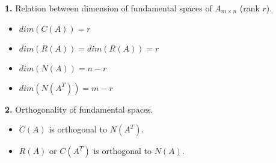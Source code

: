 \documentclass[a4paper]{article}
\numberwithin{equation}{section}
\begin{document}
\begin{itemize}
    \textbf{1.} Relation between dimension of fundamental spaces of $A_{m\times n}$ (rank $r$).
    \begin{itemize}
        \item $dim(C(A))=r$
        \item $dim(R(A))=dim(R(A))=r$
        \item $dim(N(A))=n-r$
        \item $dim(N(A^T))=m-r$
    \end{itemize}
    \textbf{2.} Orthogonality of fundamental spaces.
    \begin{itemize}
        \item $C(A)$ is orthogonal to $N(A^T)$.
        \item $R(A)$ or $C(A^T)$ is orthogonal to $N(A)$.
    \end{itemize}


\end{itemize}
\end{document}
